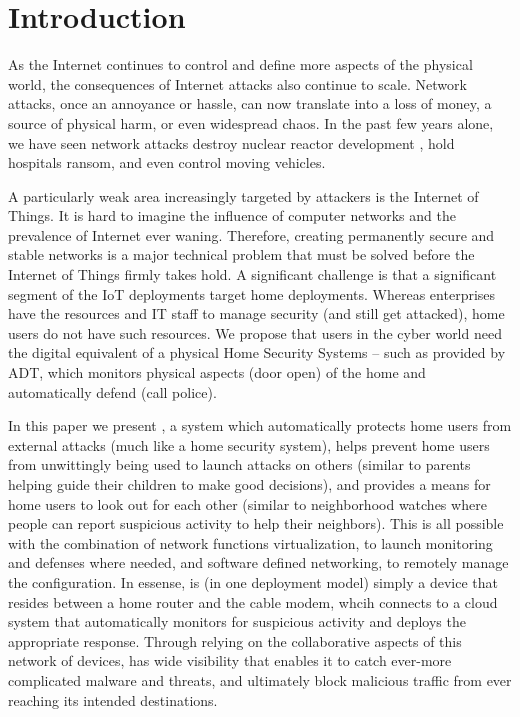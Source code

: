 \section{Introduction}
\label{sec:intro}

As the Internet continues to control and define more aspects of the physical world, the consequences of Internet attacks also continue to scale. Network attacks, once an annoyance or hassle, can now translate into a loss of money, a source of physical harm, or even widespread chaos. In the past few years alone, we have seen network attacks destroy nuclear reactor development \cite{stux}, hold hospitals ransom\cite{ransom}, and even control moving vehicles\cite{carhack}. 

A particularly weak area increasingly targeted by attackers is the Internet of Things. It is hard to imagine the influence of computer networks and the prevalence of Internet ever waning. Therefore, creating permanently secure and stable networks is a major technical problem that must be solved before the Internet of Things firmly takes hold. A significant challenge is that a significant segment of the IoT deployments target home deployments.  Whereas enterprises have the resources and IT staff to manage security (and still get attacked), home users do not have such resources.  We propose that users in the cyber world need the digital equivalent of a physical Home Security Systems -- such as provided by ADT, which monitors physical aspects (\eg door open) of the home and automatically defend (\eg call police). 



In this paper we present \sysname, a system which automatically protects home users from external attacks (much like a home security system), helps prevent home users from unwittingly being used to launch attacks on others (similar to parents helping guide their children to make good decisions), and provides a means for home users to look out for each other (similar to neighborhood watches where people can report suspicious activity to help their neighbors).  This is all possible with the combination of network functions virtualization, to launch monitoring and defenses where needed, and software defined networking, to remotely manage the configuration.  In essense, \sysname is (in one deployment model) simply a device that resides between a home router and the cable modem, whcih connects to a cloud system that automatically monitors for suspicious activity and deploys the appropriate response.  Through relying on the collaborative aspects of this network of devices, \sysname has wide visibility that enables it to catch ever-more complicated malware and threats, and ultimately block malicious traffic from ever reaching its intended destinations. 

